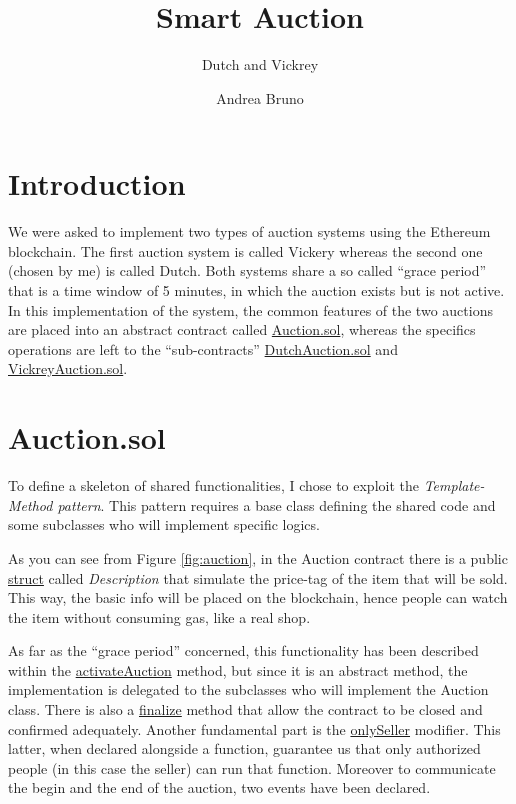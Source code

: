 \documentclass[runningheads,a4paper]{llncs}
\begin{document}
\mainmatter  %

\title{Smart Auction}
\subtitle{Dutch and Vickrey}

\author{Andrea Bruno}

\maketitle


\section{Introduction}
We were asked to implement two types of auction systems using the Ethereum blockchain. The first auction system is called Vickery whereas the second one (chosen by me) is called Dutch. Both systems share a so called ``grace period'' that is a time window of 5 minutes, in which the auction exists but is not active. In this implementation of the system, the common features of the two auctions are placed into an abstract contract called \url{Auction.sol}, whereas the specifics operations are left to the ``sub-contracts'' \url{DutchAuction.sol} and \url{VickreyAuction.sol}.


\section{Auction.sol}
To define a skeleton of shared functionalities, I chose to exploit the \emph{Template-Method pattern}. This pattern requires a base class defining the shared code and some subclasses who will implement specific logics.


As you can see from Figure \ref{fig:auction}, in the Auction contract there is a public \url{struct} called \emph{Description} that simulate the price-tag of the item that will be sold. This way, the basic info will be placed on the blockchain, hence people can watch the item without consuming gas, like a real shop.

As far as the ``grace period'' concerned, this functionality has been described within the \url{activateAuction} method, but since it is an abstract method, the implementation is delegated to the subclasses who will implement the Auction class. There is also a \url{finalize} method that allow the contract to be closed and confirmed adequately. Another fundamental part is the \url{onlySeller} modifier. This latter, when declared alongside a function, guarantee us that only authorized people (in this case the seller) can run that function. Moreover to communicate the begin and the end of the auction, two events have been declared.
\end{document}
